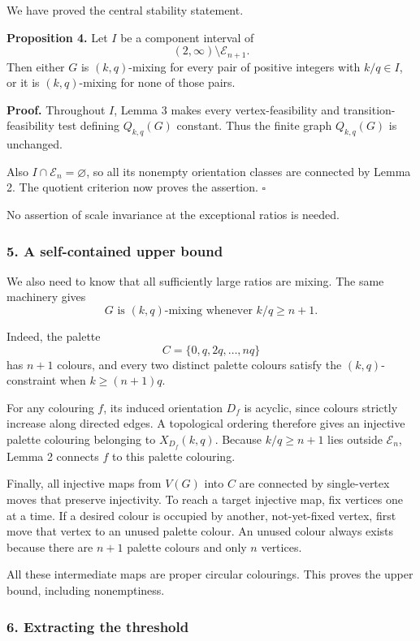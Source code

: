 \documentclass[
  11pt,
  a4paper,
]{article}
\newcounter{none} %
\begin{document}
We have proved the central stability statement.

\textbf{Proposition 4.} Let \(I\) be a component interval of \[
(2,\infty)\setminus\mathcal E_{n+1}.
\] Then either \(G\) is \((k,q)\)-mixing for every pair of positive
integers with \(k/q\in I\), or it is \((k,q)\)-mixing for none of those
pairs.

\textbf{Proof.} Throughout \(I\), Lemma 3 makes every vertex-feasibility
and transition-feasibility test defining \(Q_{k,q}(G)\) constant. Thus
the finite graph \(Q_{k,q}(G)\) is unchanged.

Also \(I\cap\mathcal E_n=\varnothing\), so all its nonempty orientation
classes are connected by Lemma 2. The quotient criterion now proves the
assertion. \(\square\)

No assertion of scale invariance at the exceptional ratios is needed.

\subsubsection{5. A self-contained upper
bound}\label{a-self-contained-upper-bound}

We also need to know that all sufficiently large ratios are mixing. The
same machinery gives \[
G\text{ is }(k,q)\text{-mixing whenever }k/q\ge n+1.
\]

Indeed, the palette \[
C=\{0,q,2q,\ldots,nq\}
\] has \(n+1\) colours, and every two distinct palette colours satisfy
the \((k,q)\)-constraint when \(k\ge(n+1)q\).

For any colouring \(f\), its induced orientation \(D_f\) is acyclic,
since colours strictly increase along directed edges. A topological
ordering therefore gives an injective palette colouring belonging to
\(X_{D_f}(k,q)\). Because \(k/q\ge n+1\) lies outside \(\mathcal E_n\),
Lemma 2 connects \(f\) to this palette colouring.

Finally, all injective maps from \(V(G)\) into \(C\) are connected by
single-vertex moves that preserve injectivity. To reach a target
injective map, fix vertices one at a time. If a desired colour is
occupied by another, not-yet-fixed vertex, first move that vertex to an
unused palette colour. An unused colour always exists because there are
\(n+1\) palette colours and only \(n\) vertices.

All these intermediate maps are proper circular colourings. This proves
the upper bound, including nonemptiness.

\subsubsection{6. Extracting the
threshold}\label{extracting-the-threshold}
\end{document}
